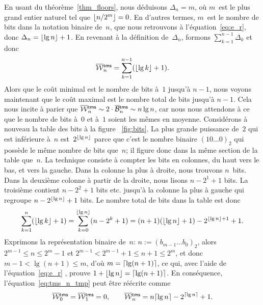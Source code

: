 En usant du théorème~\vref{thm_floors}, nous déduisons \(\Delta_n =
m\), où \(m\)~est le plus grand entier naturel tel que \(\lfloor{n/2^m}\rfloor
= 0\). En d'autres termes, \(m\)~est le nombre de bits dans la
notation binaire de~\(n\), que nous retrouvons à
l'équation~\eqref{eq:e_r}, donc \(\Delta_n = \lfloor{\lg n}\rfloor +
1\). En revenant à la définition de~\(\Delta_n\), formons
\(\sum_{k=1}^{n-1}\Delta_k\) et donc
\begin{equation}
\OW{\fun{tms}}{n} = \sum_{k=1}^{n-1}(\floor{\lg k}+1).
\label{eq:tms_n_tmp}
\end{equation}
Alors que le coût minimal est le nombre de bits à~\(1\) jusqu'à
\(n-1\), nous voyons maintenant que le coût maximal est le nombre
total de bits jusqu'à \(n-1\). Cela nous incite à parier que
\(\OW{\fun{tms}}{n} \sim 2 \cdot \OB{\fun{tms}}{n} \sim n\lg n\), car
nous nous attendons à ce que le nombre de bits à~\(0\) et à~\(1\)
soient les mêmes en moyenne. Considérons à nouveau la table des bits à
la figure \fig~\vref{fig:bits}. La plus grande puissance de~\(2\) qui
est inférieure à~\(n\) est~\(2^{\lfloor{\lg n}\rfloor}\) parce que c'est le
nombre binaire \((10\dots0)_2\) qui possède le même nombre de bits
que~\(n\); il figure donc dans la même section de la table
que~\(n\). La technique consiste à compter les bits en colonnes, du
haut vers le bas, et vers la gauche. Dans la colonne la plus à droite,
nous trouvons \(n\)~bits. Dans la deuxième colonne à partir de la
droite, nous lisons \(n-2^1+1\) bits. La troisième contient
\(n-2^2+1\) bits etc. jusqu'à la colonne la plus à gauche qui regroupe
\(n-2^{\lfloor{\lg n}\rfloor}+1\) bits. Le nombre total de bits dans la table
est donc
\begin{equation*}
\sum_{k=1}^{n}{\!(\lfloor{\lg k}\rfloor+1)}
   = \sum_{k=0}^{\lfloor{\lg n}\rfloor}{\!(n-2^k+1)}
   = (n + 1)(\lfloor{\lg n}\rfloor + 1) - 2^{\lfloor{\lg n}\rfloor+1} + 1.
\end{equation*}
Exprimons la représentation binaire de~\(n\): \(n := (b_{m-1}\dots
b_0)_2\), alors \(2^{m-1} \leqslant n \leqslant 2^m - 1\) et \(2^{m-1}
< 2^{m-1} + 1 \leqslant n + 1 \leqslant 2^m\), et donc \(m-1 < \lg(n+1)
\leqslant m\), d'où \(m = \lceil{\lg(n+1)}\rceil\), ce qui, avec l'aide de
l'équation~\eqref{eq:e_r} , prouve \(1 + \lfloor{\lg
  n}\rfloor = \lceil{\lg(n+1)}\rceil\). En conséquence,
l'équation~\eqref{eq:tms_n_tmp} peut être réécrite comme
\begin{equation}
\OW{\fun{tms}}{0} = \OW{\fun{tms}}{1} = 0,
\qquad
\OW{\fun{tms}}{n} = n\ceiling{\lg n} - 2^{\ceiling{\lg n}} + 1.
\label{eq:top}
\end{equation}
